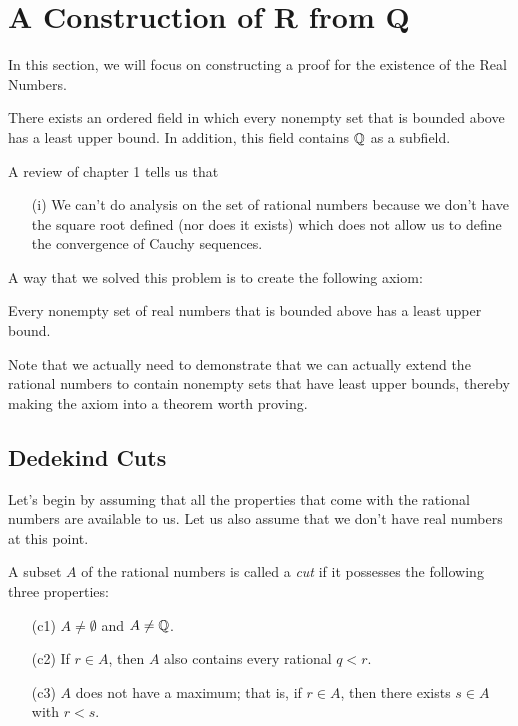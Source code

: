 \section{A Construction of R from Q}

In this section, we will focus on constructing a proof for the existence of the Real Numbers.

\begin{theorem}   There exists an ordered field in which every nonempty set that is bounded above has a least upper bound. In addition, this field contains \( \mathbb{Q}  \) as a subfield. 
\end{theorem}

A review of chapter 1 tells us that 
\begin{enumerate}
    \item[(i)] We can't do analysis on the set of rational numbers because we don't have the square root defined (nor does it exists) which does not allow us to define the convergence of Cauchy sequences.  
\end{enumerate}

A way that we solved this problem is to create the following axiom:

\begin{theorem} 
    Every nonempty set of real numbers that is bounded above has a least upper bound. 
\end{theorem}

Note that we actually need to demonstrate that we can actually extend the rational numbers to contain nonempty sets that have least upper bounds, thereby making the axiom into a theorem worth proving.


\subsection{Dedekind Cuts}

Let's begin by assuming that all the properties that come with the rational numbers are available to us. Let us also assume that we don't have real numbers at this point.

\begin{definition}[Cuts]   A subset \( A  \) of the rational numbers is called a \textit{cut} if it possesses the following three properties: 
    \begin{enumerate}
        \item[(c1)] \( A \neq \emptyset \) and \( A \neq \mathbb{Q}  \). 
        \item[(c2)] If \( r \in A  \), then \( A  \) also contains every rational \( q <  r  \).
        \item[(c3)] \( A  \) does not have a maximum; that is, if \(  r \in A  \), then there exists \( s \in A  \) with \( r < s  \). 
    \end{enumerate}
\end{definition}

